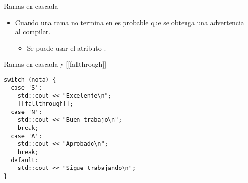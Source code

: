 \begin{frame}[t,fragile]{Ramas en cascada}
\begin{itemize}
  \item Cuando una rama no termina en  es probable que se
        obtenga una advertencia al compilar.
    \begin{itemize}
      \item Se puede usar el atributo \cppkey{[[fallthrough]]}.
    \end{itemize}
\end{itemize}

\begin{block}{Ramas en cascada y [[fallthrough]]}
\begin{lstlisting}
switch (nota) {
  case 'S':
    std::cout << "Excelente\n";
    [[fallthrough]];
  case 'N':
    std::cout << "Buen trabajo\n";
    break;
  case 'A':
    std::cout << "Aprobado\n";
    break;
  default:
    std::cout << "Sigue trabajando\n";
}
\end{lstlisting}
\end{block}
\end{frame}
